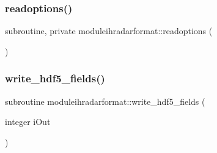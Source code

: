 \subsubsection{\texorpdfstring{readoptions()}{readoptions()}}
{\footnotesize\ttfamily subroutine, private moduleihradarformat\+::readoptions (\begin{DoxyParamCaption}{ }\end{DoxyParamCaption})\hspace{0.3cm}{\ttfamily [private]}}

\mbox{\label{namespacemoduleihradarformat_ad98c4a786bbe9735cd7eb3b391ad9adb}} 
\subsubsection{\texorpdfstring{write\+\_\+hdf5\+\_\+fields()}{write\_hdf5\_fields()}}
{\footnotesize\ttfamily subroutine moduleihradarformat\+::write\+\_\+hdf5\+\_\+fields (\begin{DoxyParamCaption}\item[{integer}]{i\+Out }\end{DoxyParamCaption})\hspace{0.3cm}{\ttfamily [private]}}

